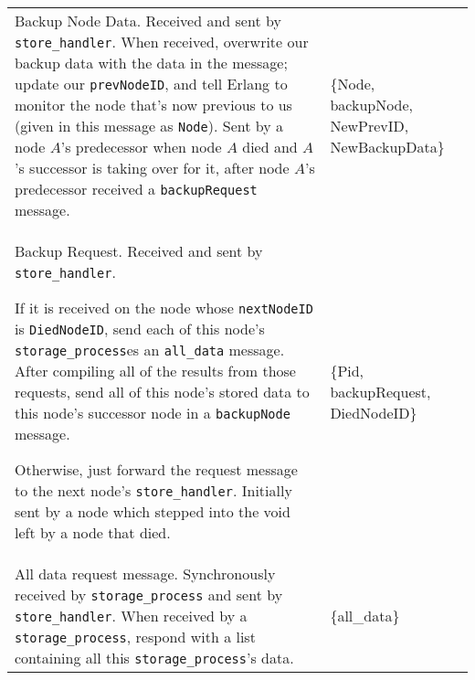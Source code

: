 \documentclass[12pt,letterpaper]{article}
\renewcommand{\tt}[1]{\texttt{#1}}
\newcommand{\sh}{\tt{store\_handler}}
\renewcommand{\sp}{\tt{storage\_process}}
\begin{document}
\begin{longtable}{p{5in}p{1.8in}}
Backup Node Data. Received and sent by \sh. When received, overwrite our backup data with the data in the message; update our \tt{prevNodeID}, and tell Erlang to monitor the node that's now previous to us (given in this message as \tt{Node}). Sent by a node $A$'s predecessor when node $A$ died and $A$'s successor is taking over for it, after node $A$'s predecessor received a \tt{backupRequest} message. &

\{Node, backupNode, NewPrevID, NewBackupData\} \\

Backup Request.  Received and sent by \sh.

If it is received on the node whose \tt{nextNodeID} is \tt{DiedNodeID}, send each of this node's \sp es an \tt{all\_data} message.  After compiling all of the results from those requests, send all of this node's stored data to this node's successor node in a \tt{backupNode} message.

Otherwise, just forward the request message to the next node's \sh. Initially sent by a node which stepped into the void left by a node that died.  & 
\{Pid, backupRequest, DiedNodeID\} \\

All data request message.  Synchronously received by \sp{} and sent by \sh.  When received by a \sp, respond with a list containing all this \sp's data.  & 
\{all\_data\} \\

\end{longtable}

\clearpage
\onehalfspacing
\end{document}
